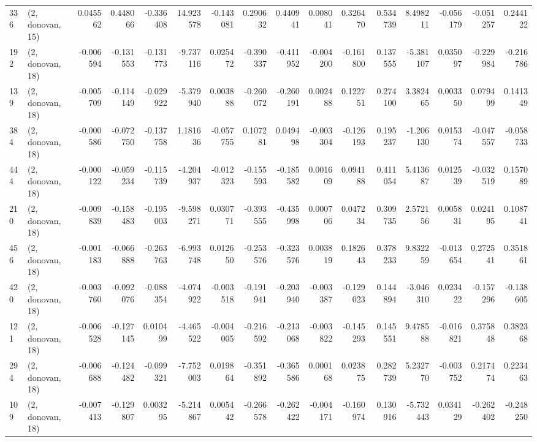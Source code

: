 \begin{tabular}{llrrrrrrrrrrrrrr}
336 &  (2, donovan, 15) &   0.045562 &  0.448066 & -0.336408 &   14.923578 & -0.143081 &   0.290632 &   0.440941 &  0.008041 &  0.326470 &  0.534739 &    8.498211 & -0.056179 &  -0.051257 &   0.244122 \\
192 &  (2, donovan, 18) &  -0.006594 & -0.131553 & -0.131773 &   -9.737116 &  0.025472 &  -0.390337 &  -0.411952 & -0.004200 & -0.161800 &  0.137555 &   -5.381107 &  0.035097 &  -0.229984 &  -0.216786 \\
139 &  (2, donovan, 18) &  -0.005709 & -0.114149 & -0.029922 &   -5.379940 &  0.003888 &  -0.260072 &  -0.260191 &  0.002488 &  0.122751 &  0.274100 &    3.382465 &  0.003350 &   0.079499 &   0.141349 \\
384 &  (2, donovan, 18) &  -0.000586 & -0.072750 & -0.137758 &    1.181636 & -0.057755 &   0.107281 &   0.049498 & -0.003304 & -0.126193 &  0.195237 &   -1.206130 &  0.015374 &  -0.047557 &  -0.058733 \\
444 &  (2, donovan, 18) &  -0.000122 & -0.059234 & -0.115739 &   -4.204937 & -0.012323 &  -0.155593 &  -0.185582 &  0.001609 &  0.094188 &  0.411054 &    5.413687 &  0.012539 &  -0.032519 &   0.157089 \\
210 &  (2, donovan, 18) &  -0.009839 & -0.158483 & -0.195003 &   -9.598271 &  0.030771 &  -0.393555 &  -0.435998 &  0.000706 &  0.047234 &  0.309735 &    2.572156 &  0.005831 &   0.024195 &   0.108741 \\
456 &  (2, donovan, 18) &  -0.001183 & -0.066888 & -0.263763 &   -6.993748 &  0.012650 &  -0.253576 &  -0.323576 &  0.003819 &  0.182643 &  0.378233 &    9.832259 & -0.013654 &   0.272541 &   0.351861 \\
420 &  (2, donovan, 18) &  -0.003760 & -0.092076 & -0.088354 &   -4.074922 & -0.003518 &  -0.191941 &  -0.203940 & -0.003387 & -0.129023 &  0.144894 &   -3.046310 &  0.023422 &  -0.157296 &  -0.138605 \\
121 &  (2, donovan, 18) &  -0.006528 & -0.127145 &  0.010499 &   -4.465522 & -0.004005 &  -0.216592 &  -0.213068 & -0.003822 & -0.145293 &  0.145551 &    9.478588 & -0.016821 &   0.375848 &   0.382368 \\
294 &  (2, donovan, 18) &  -0.006688 & -0.124482 & -0.099321 &   -7.752003 &  0.019864 &  -0.351892 &  -0.365586 &  0.000168 &  0.023875 &  0.282739 &    5.232770 & -0.003752 &   0.217474 &   0.223463 \\
109 &  (2, donovan, 18) &  -0.007413 & -0.129807 &  0.003295 &   -5.214867 &  0.005442 &  -0.266578 &  -0.262422 & -0.004171 & -0.160974 &  0.130916 &   -5.732443 &  0.034129 &  -0.262402 &  -0.248250 \\

\end{tabular}
